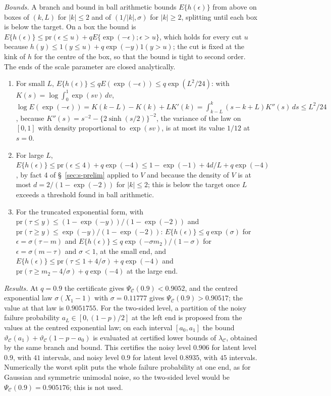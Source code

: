 \documentclass[12pt]{article}
\renewcommand{\_}{\usc\allowbreak}
\theoremstyle{definition}
\numberwithin{equation}{section}
\newcommand{\pr}{\mathrm{pr}}
\newcommand{\E}{\mathcal{C}}
\begin{document}
\emph{Bounds.} A branch and bound in ball arithmetic bounds $E\{h(\epsilon)\}$ from above on boxes of $(k, L)$ for $|k| \le 2$ and of $(1/|k|, \sigma)$ for $|k| \ge 2$, splitting until each box is below the target. On a box the bound is $E\{h(\epsilon)\} \le \pr(\epsilon \le u) + qE\{\exp(-\epsilon); \epsilon > u\}$, which holds for every cut $u$ because $h(y) \le 1(y \le u) + q\exp(-y)1(y > u)$; the cut is fixed at the kink of $h$ for the centre of the box, so that the bound is tight to second order. The ends of the scale parameter are closed analytically.
\begin{enumerate}
\item For small $L$, $E\{h(\epsilon)\} \le qE(\exp(-\epsilon)) \le q\exp(L^2/24)$: with $K(s) = \log\int_0^1\exp(sv)\,dv$, $\log E(\exp(-\epsilon)) = K(k - L) - K(k) + LK'(k) = \int_{k - L}^{k}(s - k + L)K''(s)\,ds \le L^2/24$, because $K''(s) = s^{-2} - \{2\sinh(s/2)\}^{-2}$, the variance of the law on $[0, 1]$ with density proportional to $\exp(sv)$, is at most its value $1/12$ at $s = 0$.
\item For large $L$, $E\{h(\epsilon)\} \le \pr(\epsilon \le 4) + q\exp(-4) \le 1 - \exp(-1) + 4d/L + q\exp(-4)$, by fact 4 of \S~\ref{sec:s-prelim} applied to $V$ and because the density of $V$ is at most $d = 2/(1 - \exp(-2))$ for $|k| \le 2$; this is below the target once $L$ exceeds a threshold found in ball arithmetic.
\item For the truncated exponential form, with $\pr(\tau \le y) \le (1 - \exp(-y))/(1 - \exp(-2))$ and $\pr(\tau \ge y) \le \exp(-y)/(1 - \exp(-2))$: $E\{h(\epsilon)\} \le q\exp(\sigma)$ for $\epsilon = \sigma(\tau - m)$ and $E\{h(\epsilon)\} \le q\exp(-\sigma m_2)/(1 - \sigma)$ for $\epsilon = \sigma(m - \tau)$ and $\sigma < 1$, at the small end, and $E\{h(\epsilon)\} \le \pr(\tau \le 1 + 4/\sigma) + q\exp(-4)$ and $\pr(\tau \ge m_2 - 4/\sigma) + q\exp(-4)$ at the large end.
\end{enumerate}

\emph{Results.} At $q = 0.9$ the certificate gives $\Psi_{\E}(0.9) < 0.9052$, and the centred exponential law $\sigma(X_1 - 1)$ with $\sigma = 0.11777$ gives $\Psi_{\E}(0.9) > 0.90517$; the value at that law is $0.9051755$. For the two-sided level, a partition of the noisy failure probability $a_L \in [0, (1 - p)/2]$ at the left end is proposed from the values at the centred exponential law; on each interval $[a_0, a_1]$ the bound $\vartheta_{\E}(a_1) + \vartheta_{\E}(1 - p - a_0)$ is evaluated at certified lower bounds of $\lambda_{\E}$, obtained by the same branch and bound. This certifies the noisy level $0.906$ for latent level $0.9$, with $41$ intervals, and noisy level $0.9$ for latent level $0.8935$, with $45$ intervals. Numerically the worst split puts the whole failure probability at one end, as for Gaussian and symmetric unimodal noise, so the two-sided level would be $\Psi_{\E}(0.9) = 0.905176$; this is not used.
\end{document}
